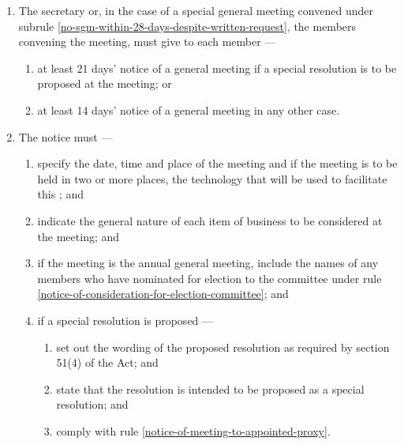 \documentclass[../constitution.tex]{subfiles}
\begin{document}
\begin{enumerate}

\item The secretary or, in the case of a special general meeting convened under subrule \ref{no-sgm-within-28-days-despite-written-request}, the members convening the meeting, must give to each member ---

  \begin{enumerate}
  
  \item at least 21 days' notice of a general meeting if a special resolution is to be proposed at the meeting; or
  \item at least 14 days' notice of a general meeting in any other case.
  \end{enumerate}
\item The notice must ---

  \begin{enumerate}
  
  \item specify the date, time and place of the meeting and if the meeting is to be held in two or more places, the technology that will be used to facilitate this ; and
  \item indicate the general nature of each item of business to be considered at the meeting; and
  \item if the meeting is the annual general meeting, include the names of any members who have nominated for election to the committee under rule \ref{notice-of-consideration-for-election-committee}; and
  \item if a special resolution is proposed ---

    \begin{enumerate}
    
    \item set out the wording of the proposed resolution as required by section 51(4) of the Act; and
    \item state that the resolution is intended to be proposed as a special resolution; and
    \item comply with rule \ref{notice-of-meeting-to-appointed-proxy}.
    \end{enumerate}
  \end{enumerate}


\end{enumerate}
\end{document}
